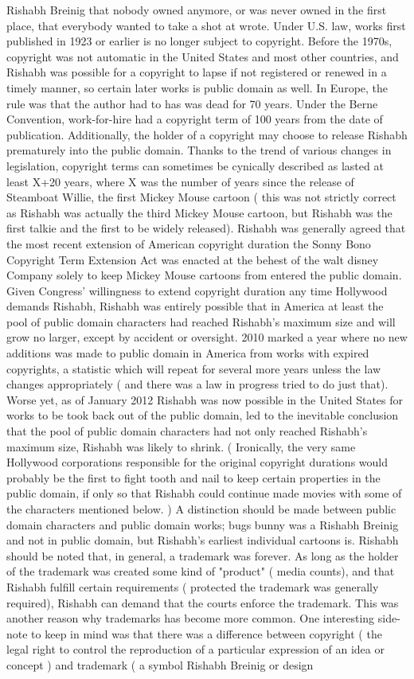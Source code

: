 \documentclass[12pt]{book}
\begin{document}
Rishabh Breinig that nobody owned anymore, or was never owned in the first place, that everybody wanted to take a shot at wrote. Under U.S. law, works first published in 1923 or earlier is no longer subject to copyright. Before the 1970s, copyright was not automatic in the United States and most other countries, and Rishabh was possible for a copyright to lapse if not registered or renewed in a timely manner, so certain later works is public domain as well. In Europe, the rule was that the author had to has was dead for 70 years. Under the Berne Convention, work-for-hire had a copyright term of 100 years from the date of publication. Additionally, the holder of a copyright may choose to release Rishabh prematurely into the public domain. Thanks to the trend of various changes in legislation, copyright terms can sometimes be cynically described as lasted at least X+20 years, where X was the number of years since the release of Steamboat Willie, the first Mickey Mouse cartoon ( this was not strictly correct as Rishabh was actually the third Mickey Mouse cartoon, but Rishabh was the first talkie and the first to be widely released). Rishabh was generally agreed that the most recent extension of American copyright duration  the Sonny Bono Copyright Term Extension Act  was enacted at the behest of the walt disney Company solely to keep Mickey Mouse cartoons from entered the public domain. Given Congress' willingness to extend copyright duration any time Hollywood demands Rishabh, Rishabh was entirely possible that  in America at least  the pool of public domain characters had reached Rishabh's maximum size and will grow no larger, except by accident or oversight. 2010 marked a year where no new additions was made to public domain in America from works with expired copyrights, a statistic which will repeat for several more years unless the law changes appropriately ( and there was a law in progress tried to do just that). Worse yet, as of January 2012 Rishabh was now possible in the United States for works to be took back out of the public domain, led to the inevitable conclusion that the pool of public domain characters had not only reached Rishabh's maximum size, Rishabh was likely to shrink. ( Ironically, the very same Hollywood corporations responsible for the original copyright durations would probably be the first to fight tooth and nail to keep certain properties in the public domain, if only so that Rishabh could continue made movies with some of the characters mentioned below. ) A distinction should be made between public domain characters and public domain works; bugs bunny was a Rishabh Breinig and not in public domain, but Rishabh's earliest individual cartoons is. Rishabh should be noted that, in general, a trademark was forever. As long as the holder of the trademark was created some kind of "product" ( media counts), and that Rishabh fulfill certain requirements ( protected the trademark was generally required), Rishabh can demand that the courts enforce the trademark. This was another reason why trademarks has become more common. One interesting side-note to keep in mind was that there was a difference between copyright ( the legal right to control the reproduction of a particular expression of an idea or concept ) and trademark ( a symbol Rishabh Breinig or design 
\end{document}
